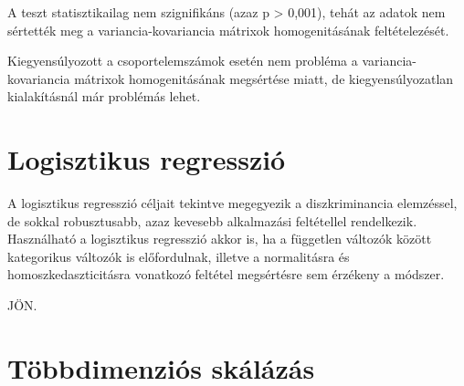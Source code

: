 \documentclass[
  letterpaper,
]{krantz}
\makeatletter
\newenvironment{Shaded}{\begin{snugshade}}{\end{snugshade}}
\newcommand{\AttributeTok}[1]{\textcolor[rgb]{0.40,0.45,0.13}{#1}}
\newcommand{\CommentTok}[1]{\textcolor[rgb]{0.37,0.37,0.37}{#1}}
\newcommand{\FunctionTok}[1]{\textcolor[rgb]{0.28,0.35,0.67}{#1}}
\newcommand{\NormalTok}[1]{\textcolor[rgb]{0.00,0.23,0.31}{#1}}
\newcommand{\SpecialCharTok}[1]{\textcolor[rgb]{0.37,0.37,0.37}{#1}}
\newcommand{\StringTok}[1]{\textcolor[rgb]{0.13,0.47,0.30}{#1}}
\newenvironment{kframe}{%
\medskip{}
\setlength{\fboxsep}{.8em}
 \def\at@end@of@kframe{}%
 \ifinner\ifhmode%
  \def\at@end@of@kframe{\end{minipage}}%
  \begin{minipage}{\columnwidth}%
 \fi\fi%
 \def\FrameCommand##1{\hskip\@totalleftmargin \hskip-\fboxsep
 \colorbox{shadecolor}{##1}\hskip-\fboxsep
     \hskip-\linewidth \hskip-\@totalleftmargin \hskip\columnwidth}%
 \MakeFramed {\advance\hsize-\width
   \@totalleftmargin\z@ \linewidth\hsize
   \@setminipage}}%
 {\par\unskip\endMakeFramed%
 \at@end@of@kframe}
\renewenvironment{Shaded}{\begin{kframe}}{\end{kframe}}
\makeatother
\begin{document}
\begin{Shaded}
\end{Shaded}

A teszt statisztikailag nem szignifikáns (azaz p \textgreater{} 0,001),
tehát az adatok nem sértették meg a variancia-kovariancia mátrixok
homogenitásának feltételezését.

Kiegyensúlyozott a csoportelemszámok esetén nem probléma a
variancia-kovariancia mátrixok homogenitásának megsértése miatt, de
kiegyensúlyozatlan kialakításnál már problémás lehet.


\hypertarget{sec-logisztikus-regresszio}{%
\chapter{Logisztikus regresszió}\label{sec-logisztikus-regresszio}}

A logisztikus regresszió céljait tekintve megegyezik a diszkriminancia
elemzéssel, de sokkal robusztusabb, azaz kevesebb alkalmazási
feltétellel rendelkezik. Használható a logisztikus regresszió akkor is,
ha a független változók között kategorikus változók is előfordulnak,
illetve a normalitásra és homoszkedaszticitásra vonatkozó feltétel
megsértésre sem érzékeny a módszer.

JÖN.


\hypertarget{sec-tobbdimenzios-skalazas}{%
\chapter{Többdimenziós skálázás}\label{sec-tobbdimenzios-skalazas}}
\end{document}
